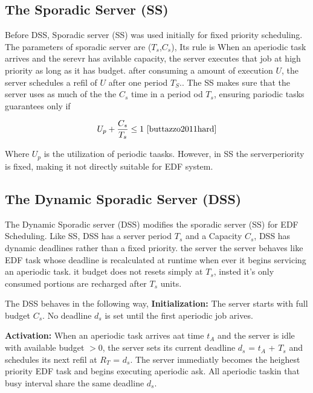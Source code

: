\documentclass[conference]{IEEEtran}
\begin{document}
\subsection{The Sporadic Server (SS)} 

Before DSS, Sporadic server (SS) was used initially for fixed priority scheduling\cite{buttazzo2011hard}. The parameters of sporadic server are ($T_s$,$C_s$), Its rule is When an aperiodic task arrives and the serevr has avilable capacity, the server executes that job at high priority as long as it has budget. after consuming a amount of execution $U$, the server schedules a refil of $U$ after one period $T_S$\cite{buttazzo2011hard}.. The SS makes sure that the server uses as much of the the $C_s$ time in a period od $T_s$, ensuring pariodic tasks guarantees only if\cite{buttazzo2011hard}

\[
U_p + \frac{C_s}{T_s} \leq 1
\ \cite{buttazzo2011hard} \]

Where $U_p$ is the utilization of periodic taasks. However, in SS the serverperiority is fixed, making it not directly suitable for EDF system\cite{buttazzo2011hard}.

\subsection{The Dynamic Sporadic Server (DSS)}
The Dynamic Sporadic server (DSS) modifies the sporadic server (SS) for EDF Scheduling\cite{spuri1994efficient}.
Like SS, DSS has a server period $T_s$ and a Capacity $C_s$, DSS has dynamic deadlines rather than a fixed priority. the server the server behaves like EDF task whose deadline is recalculated at runtime when ever it begins servicing an aperiodic task. it budget does not resets simply at $T_s$, insted it's only consumed portions are recharged after $T_s$ units\cite{spuri1994efficient,buttazzo2011hard}.

The DSS behaves in the following way,
\textbf{Initialization:} The server starts with full budget $C_s$. No deadline $d_s$ is set until the first aperiodic job arives\cite{spuri1994efficient,buttazzo2011hard}.

\textbf{Activation:} When an aperiodic task arrives aat time $t_A$ and the server is idle with available budget $>0$, the server sets its current deadline $d_s$ = $t_A$ + $T_s$\cite{spuri1994efficient} and schedules its next refil at $R_T$ = $d_s$\cite{spuri1994efficient}. The server immediatly becomes the heighest priority EDF task and begins executing aperiodic ask. All aperiodic taskin that busy interval share the same deadline $d_s$\cite{spuri1994efficient}.
\end{document}
